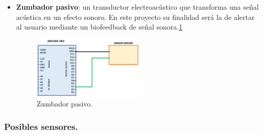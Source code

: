 \begin{itemize}
\item \textbf{Zumbador pasivo}: un transductor electroacústico que transforma una señal acústica en un efecto sonoro. En este proyecto su finalidad será la de alertar al usuario mediante un biofeedback de señal sonora.\ref{fig:zumbador}
\begin{figure}[h!]
    \centering
    \includegraphics[width=0.5\textwidth]{img/SW520D.png}
    \caption{Zumbador pasivo.}
    \label{fig:zumbador} %
\end{figure}

\end{itemize}


\subsubsection{Posibles sensores.}

